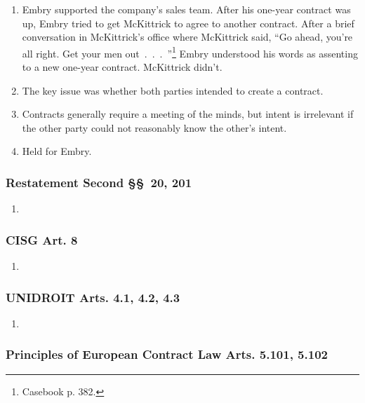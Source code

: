 \begin{enumerate}
    \item Embry supported the company's sales team. After his one-year 
    contract was up, Embry tried to get McKittrick to agree to another 
    contract. After a brief conversation in McKittrick's office where 
    McKittrick said, ``Go ahead, you're all right. Get your men 
    out~.~.~.~''\footnote{Casebook p. 382.} Embry understood his words as 
    assenting to a new one-year contract. McKittrick didn't.
    \item The key issue was whether both parties intended to create a 
    contract.
    \item Contracts generally require a meeting of the minds, but intent is 
    irrelevant if the other party could not reasonably know the other's 
    intent.
    \item Held for Embry.
\end{enumerate}

\subsubsection{Restatement Second \S\S\ 20, 201}

\begin{enumerate}
    \item %
\end{enumerate}

\subsubsection{CISG Art. 8}

\begin{enumerate}
    \item %
\end{enumerate}

\subsubsection{UNIDROIT Arts. 4.1, 4.2, 4.3}

\begin{enumerate}
    \item %
\end{enumerate}

\subsubsection{Principles of European Contract Law Arts. 5.101, 5.102}


